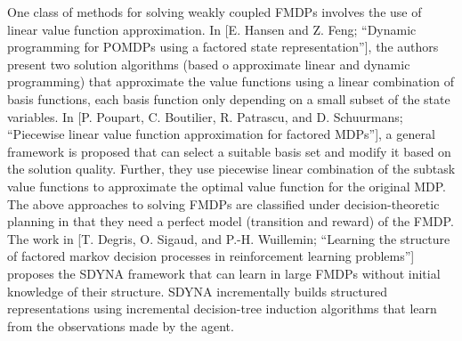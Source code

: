 \documentclass[11pt]{article}
\begin{document}
One class of methods for solving weakly coupled FMDPs involves the use of linear value function approximation. In [E. Hansen and Z. Feng; “Dynamic programming for POMDPs using a factored state representation”], the authors present two solution algorithms (based o approximate linear and dynamic programming) that approximate the value functions using a linear combination of basis functions, each basis function only depending on a small subset of the state variables. In [P. Poupart, C. Boutilier, R. Patrascu, and D. Schuurmans; “Piecewise linear value function approximation for factored MDPs”], a general framework is proposed that can select a suitable basis set and modify it based on the solution quality. Further, they use piecewise linear combination of the subtask value functions to approximate the optimal value function for the original MDP. The above approaches to solving FMDPs are classified under decision-theoretic planning in that they need a perfect model (transition and reward) of the FMDP. The work in [T. Degris, O. Sigaud, and P.-H. Wuillemin; “Learning the structure of factored markov decision processes in reinforcement learning problems”] proposes the SDYNA framework that can learn in large FMDPs without initial knowledge of their structure. SDYNA incrementally builds structured representations using incremental decision-tree induction algorithms that learn from the observations made by the agent.
\end{document}
